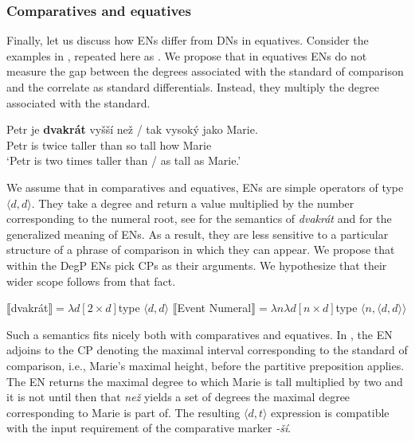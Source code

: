 \documentclass[output=paper,
modfonts,
hidelinks,
newtxmath
]{langscibook}
\begin{document}
\subsubsection{Comparatives and equatives}\label{comparatives-and-equatives}

Finally, let us discuss how ENs differ from DNs in equatives. Consider the examples in , repeated here as . We propose that in equatives ENs do not measure the gap between the degrees associated with the standard of comparison and the correlate as standard differentials. Instead, they multiply the degree associated with the standard.

\ea\label{comp-eq-dvakrat} \gll Petr je \textbf{dvakrát} vyšší než / tak vysoký jako Marie.\\
Petr is twice taller than {} so tall how Marie\\
\glt `Petr is two times taller than / as tall as Marie.'
\z

\noindent We assume that in comparatives and equatives, ENs are simple operators of type $\langle d,d\rangle$. They take a degree and return a value multiplied by the number corresponding to the numeral root, see  for the semantics of \textit{dvakrát} and  for the generalized meaning of ENs. As a result, they are less sensitive to a particular structure of a phrase of comparison in which they can appear. We propose that within the DegP ENs pick CPs as their arguments. We hypothesize that their wider scope follows from that fact.

\ea \ea $\llbracket$dvakrát$\rrbracket = \lambda d[2 \times d]$\hfill type $\langle d,d\rangle$\label{event-num-semantics-dvakrat}
\ex $\llbracket$Event Numeral$\rrbracket = \lambda n\lambda d[n \times d]$\hfill type $\langle n,\langle d,d\rangle\rangle$\label{event-num-semantics-abstract}
\z \z

\noindent Such a semantics fits nicely both with comparatives and equatives. In , the EN adjoins to the CP denoting the maximal interval corresponding to the standard of comparison, i.e., Marie's maximal height, before the partitive preposition applies. The EN returns the maximal degree to which Marie is tall multiplied by two and it is not until then that \textit{než} yields a set of degrees the maximal degree corresponding to Marie is part of. The resulting $\langle d,t\rangle$ expression is compatible with the input requirement of the comparative marker \textit{-ší}. 
\end{document}
